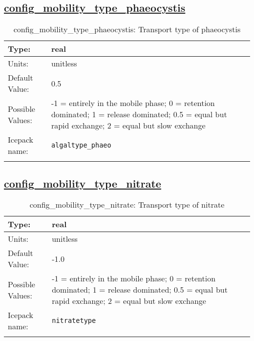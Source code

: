 \subsection[config\_mobility\_type\_phaeocystis]{\hyperref[sec:nm_tab_biogeochemistry]{config\_mobility\_type\_phaeocystis}}
\label{subsec:nm_sec_config_mobility_type_phaeocystis}
\begin{center}
\begin{longtable}{| p{2.0in} || p{4.0in} |}
    \hline
    Type: & real \\
    \hline
    Units: & \si{unitless} \\
    \hline
    Default Value: & 0.5 \\
    \hline
    Possible Values: & -1 = entirely in the mobile phase; 0 = retention dominated; 1 = release dominated; 0.5 = equal but rapid exchange; 2 = equal but slow exchange \\
    \hline
    \hline
    Icepack name: & \verb+algaltype_phaeo+ \\
    \caption{config\_mobility\_type\_phaeocystis: Transport type of phaeocystis}
\end{longtable}
\end{center}
\subsection[config\_mobility\_type\_nitrate]{\hyperref[sec:nm_tab_biogeochemistry]{config\_mobility\_type\_nitrate}}
\label{subsec:nm_sec_config_mobility_type_nitrate}
\begin{center}
\begin{longtable}{| p{2.0in} || p{4.0in} |}
    \hline
    Type: & real \\
    \hline
    Units: & \si{unitless} \\
    \hline
    Default Value: & -1.0 \\
    \hline
    Possible Values: & -1 = entirely in the mobile phase; 0 = retention dominated; 1 = release dominated; 0.5 = equal but rapid exchange; 2 = equal but slow exchange \\
    \hline
    \hline
    Icepack name: & \verb+nitratetype+ \\
    \caption{config\_mobility\_type\_nitrate: Transport type of nitrate}
\end{longtable}
\end{center}
